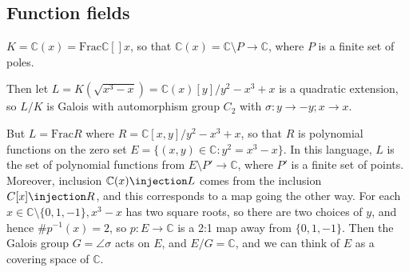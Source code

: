 \documentclass[a4paper, 10pt, twocolumn]{amsart}
\begin{document}
\subsection*{Function fields}
$K = \mathbb{C}(x) = \text{Frac}\mathbb{C}[]x$, so that $\mathbb{C}(x) = \mathbb{C}\setminus P \to \mathbb{C}$, where $P$ is a finite set of poles.

Then let $L = K(\sqrt{x^3-x}) = \mathbb{C}(x)[y]/y^2-x^3+x$ is a quadratic extension, so $L/K$ is Galois with automorphism group $C_2$ with $\sigma:y \to -y; x\to x$.

But $L = \text{Frac}R$ where $R = \mathbb{C}[x,y]/y^2-x^3+x$, so that $R$ is polynomial functions on the zero set $E = \{(x,y)\in \mathbb{C} : y^2=x^3-x\}$. In this language, $L$ is the set of polynomial functions from $E \setminus P' \to \mathbb{C}$, where $P'$ is a finite set of points. Moreover, inclusion $\mathbb{C}(x) \injection L$ comes from the inclusion $C[x] \injection R$, and this corresponds to a map going the other way. For each $x \in \mathbb{C}\setminus\{0,1,-1\}, x^3-x$ has two square roots, so there are two choices of $y$, and hence $\#p^{-1}(x) = 2$, so $p:E\to \mathbb{C}$ is a 2:1 map away from $\{0,1,-1\}$. Then the Galois group $G = \angle{\sigma}$ acts on $E$, and $E/G = \mathbb{C}$, and we can think of $E$ as a covering space of $\mathbb{C}$.


\end{document}
